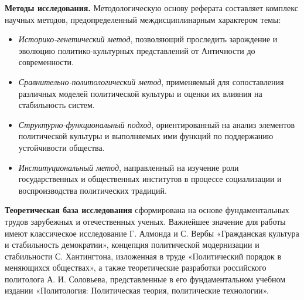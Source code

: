 {\bf Методы исследования.} Методологическую основу реферата составляет комплекс научных методов, предопределенный междисциплинарным характером темы:
\begin{itemize}
    \item {\it Историко-генетический метод}, позволяющий проследить зарождение и эволюцию политико-культурных представлений от Античности до современности.
    \item {\it Сравнительно-политологический метод}, применяемый для сопоставления различных моделей политической культуры и оценки их влияния на стабильность систем.
    \item {\it Структурно-функциональный подход}, ориентированный на анализ элементов политической культуры и выполняемых ими функций по поддержанию устойчивости общества.
    \item {\it Институциональный метод}, направленный на изучение роли государственных и общественных институтов в процессе социализации и воспроизводства политических традиций.
\end{itemize}

{\bf Теоретическая база исследования} сформирована на основе фундаментальных трудов зарубежных и отечественных ученых. Важнейшее значение для работы имеют классическое исследование Г. Алмонда и С. Вербы «Гражданская культура и стабильность демократии», концепция политической модернизации и стабильности С. Хантингтона, изложенная в труде «Политический порядок в меняющихся обществах», а также теоретические разработки российского политолога А. И. Соловьева, представленные в его фундаментальном учебном издании «Политология: Политическая теория, политические технологии».
